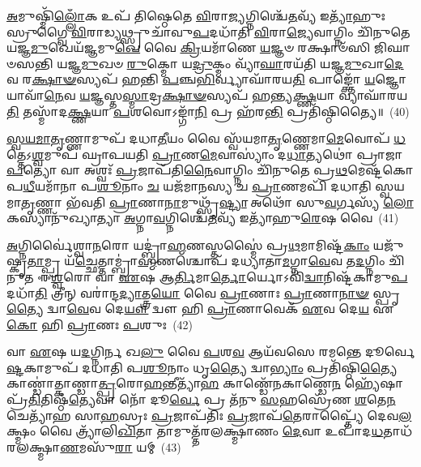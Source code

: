 \-\ul{𑌅}\-𑌮𑍁𑌷𑍍𑌮𑌿᳴\-\ul{𑌲𑍍𑌲𑍋𑌁}\-𑌕 𑌉𑌪᳴ 𑌤𑌿𑌷𑍍𑌠𑍇𑌤𑍇 \ul{𑌵𑌿}\-𑌰𑌾\-\ul{𑌜𑍍𑌯}\-𑌗𑍍𑌨𑌿𑌶𑍍𑌚𑍇᳴\-\ul{𑌤}\-𑌵𑍍𑌯᳴ 𑌇\-\ul{𑌤𑍍𑌯𑌾}\-᳴𑌹𑍁𑌃 𑌸𑍍𑌰𑍁𑌗𑍍𑌵𑍈 \ul{𑌵𑌿}\-𑌰𑌾𑌡𑍍𑌯𑌥𑍍𑌸𑍍𑌰𑍁𑌚𑌾᳴𑌵𑍁\-\ul{𑌪}\-𑌦𑌧𑌾᳴𑌤𑌿 \ul{𑌵𑌿}\-𑌰𑌾\-\ul{𑌜𑍍𑌯𑍇}\-𑌵𑌾𑌗𑍍𑌨𑌿𑌂 𑌚𑌿᳴𑌨𑍁𑌤𑍇 𑌯𑌜𑍍𑌞\-\ul{𑌮𑍁}\-𑌖𑍇𑌯᳴𑌜𑍍𑌞𑌮𑍁\-\ul{𑌖𑍇} 𑌵𑍈 \ul{𑌕𑍍𑌰𑌿}\-𑌯𑌮𑌾᳴𑌣𑍇 \ul{𑌯}\-𑌜𑍍𑌞𑍞 𑌰𑌕𑍍𑌷𑌾𑍞᳴𑌸𑌿 𑌜𑌿𑌘𑌾𑍞𑌸𑌨𑍍𑌤𑌿 𑌯𑌜𑍍𑌞\-\ul{𑌮𑍁}\-𑌖𑍞 \ul{𑌰𑍁}\-𑌕𑍍𑌮𑍋 𑌯\-\ul{𑌦𑍍𑌰𑍁}\-𑌕𑍍𑌮𑌂 𑌵𑍍𑌯𑌾᳴\-\ul{𑌘𑌾}\-𑌰𑌯᳴𑌤𑌿 𑌯𑌜𑍍𑌞\-\ul{𑌮𑍁}\-𑌖𑌾\-\ul{𑌦𑍇}\-𑌵 𑌰\-\ul{𑌕𑍍𑌷𑌾}\-\-\ul{𑍟}\-𑌸𑍍𑌯𑌪᳴ 𑌹𑌨𑍍𑌤𑌿 \ul{𑌪}\-𑌞𑍍𑌚\-\ul{𑌭𑌿}\-𑌰𑍍𑌵𑍍𑌯𑌾𑌘𑌾᳴𑌰𑌯\-\ul{𑌤𑌿} 𑌪𑌾𑌙𑍍𑌕𑍍𑌤𑍋᳴ \ul{𑌯}\-𑌜𑍍𑌞𑍋 𑌯𑌾𑌵𑌾᳴\-\ul{𑌨𑍇}\-𑌵 \ul{𑌯}\-𑌜𑍍𑌞𑌸𑍍𑌤\-\ul{𑌸𑍍𑌮𑌾}\-𑌦𑍍𑌰\-\ul{𑌕𑍍𑌷𑌾}\-\-\ul{𑍟}\-𑌸𑍍𑌯𑌪᳴ 𑌹𑌨𑍍𑌤𑍍𑌯\-\ul{𑌕𑍍𑌷𑍍𑌣}\-𑌯𑌾 𑌵𑍍𑌯𑌾𑌘𑌾᳴𑌰𑌯\-\ul{𑌤𑌿} 𑌤𑌸𑍍𑌮𑌾᳴𑌦\-\ul{𑌕𑍍𑌷𑍍𑌣}\-𑌯𑌾 \ul{𑌪}\-𑌶𑌵𑍋\-𑌽𑌙𑍍𑌗𑌾᳴\-\ul{𑌨𑌿} 𑌪𑍍𑌰 𑌹᳴𑌰\-\ul{𑌨𑍍𑌤𑌿} 𑌪𑍍𑌰𑌤𑌿᳴𑌷𑍍𑌠𑌿𑌤𑍍𑌯𑍈॥~(40)

{\anuvakamend[{𑌵\-\ul{𑌨}\-𑌸𑍍𑌪𑌤᳴𑌯𑍋 𑌦𑌕𑍍𑌷𑌿\-\ul{𑌣}\-𑌤𑍋 𑌧᳴𑌤𑍍𑌤 𑌏\-\ul{𑌨}\-𑌨𑍍𑌤𑌸𑍍𑌮𑌾᳴𑌦\-\ul{𑌕𑍍𑌷𑍍𑌣}\-𑌯𑌾 𑌪𑌞𑍍𑌚᳴ 𑌚}]}%

\-\ul{𑌸𑍍𑌵}\-\-\ul{𑌯}\-\-\ul{𑌮𑌾}\-\-\ul{𑌤𑍃}\-𑌣𑍍𑌣𑌾𑌮𑍁𑌪᳴ 𑌦𑌧𑌾\-\ul{𑌤𑍀}\-𑌯𑌂 𑌵𑍈 𑌸𑍍𑌵᳴𑌯𑌮𑌾\-\ul{𑌤𑍃}\-𑌣𑍍𑌣𑍇𑌮𑌾\-\ul{𑌮𑍇}\-𑌵𑍋𑌪᳴ \ul{𑌧}\-𑌤𑍍𑌤𑍇\-𑌽\-\ul{𑌶𑍍𑌵}\-𑌮𑍁𑌪᳴ 𑌘𑍍𑌰𑌾𑌪𑌯𑌤𑌿 \ul{𑌪𑍍𑌰𑌾}\-𑌣\-\ul{𑌮𑍇}\-𑌵𑌾𑌸𑍍𑌯𑌾𑌂॑ 𑌦\-\ul{𑌧𑌾}\-𑌤𑍍𑌯𑌥𑍋॑ 𑌪𑍍𑌰𑌾𑌜𑌾\-\ul{𑌪}\-𑌤𑍍𑌯𑍋 𑌵𑌾 𑌅𑌶𑍍𑌵𑌃᳴ \ul{𑌪𑍍𑌰}\-𑌜𑌾𑌪᳴𑌤𑌿\-\ul{𑌨𑍈}\-𑌵𑌾𑌗𑍍𑌨𑌿𑌂 𑌚𑌿᳴𑌨𑍁𑌤𑍇 𑌪𑍍𑌰\-\ul{𑌥}\-𑌮𑍇𑌷𑍍𑌟᳴𑌕𑍋𑌪\-\ul{𑌧𑍀}\-𑌯𑌮𑌾᳴𑌨𑌾 𑌪\-\ul{𑌶𑍂}\-𑌨𑌾𑌂 \ul{𑌚} 𑌯𑌜᳴𑌮𑌾𑌨𑌸𑍍𑌯 𑌚 \ul{𑌪𑍍𑌰𑌾}\-𑌣𑌮𑌪𑌿᳴ 𑌦𑌧𑌾𑌤𑌿 𑌸𑍍𑌵𑌯𑌮𑌾\-\ul{𑌤𑍃}\-𑌣𑍍𑌣𑌾 𑌭᳴𑌵𑌤𑌿 \ul{𑌪𑍍𑌰𑌾}\-𑌣𑌾\-\ul{𑌨𑌾}\-𑌮𑍁𑌥𑍍𑌸𑍃᳴\-\ul{𑌷𑍍𑌟𑍍𑌯𑌾} 𑌅𑌥𑍋᳴ 𑌸𑍁\-\ul{𑌵}\-𑌰𑍍𑌗𑌸𑍍𑌯᳴ \ul{𑌲𑍋}\-𑌕𑌸𑍍𑌯𑌾𑌨𑍁᳴𑌖𑍍𑌯𑌾𑌤𑍍𑌯𑌾 \ul{𑌅}\-𑌗𑍍𑌨𑌾\-\ul{𑌵}\-𑌗𑍍𑌨𑌿𑌶𑍍𑌚𑍇᳴\-\ul{𑌤}\-𑌵𑍍𑌯᳴ 𑌇𑌤𑍍𑌯𑌾᳴𑌹𑍁\-\ul{𑌰𑍇}\-𑌷 𑌵𑍈~(41)

\-\ul{𑌅}\-𑌗𑍍𑌨𑌿𑌰𑍍𑌵𑍈॑𑌶𑍍𑌵𑌾\-\ul{𑌨}\-𑌰𑍋 𑌯𑌦𑍍𑌬𑍍𑌰𑌾॑\-\ul{𑌹𑍍𑌮}\-𑌣𑌸𑍍𑌤𑌸𑍍𑌮𑍈॑ 𑌪𑍍𑌰\-\ul{𑌥}\-𑌮𑌾𑌮𑌿𑌷𑍍𑌟᳴\-\ul{𑌕𑌾𑌂} 𑌯𑌜𑍁᳴𑌷𑍍𑌕𑍃\-\ul{𑌤𑌾}\-𑌮𑍍𑌪𑍍𑌰 𑌯᳴\-\ul{𑌚𑍍𑌛𑍇}\-𑌤𑍍𑌤𑌾𑌮𑍍𑌬𑍍𑌰𑌾॑\-\ul{𑌹𑍍𑌮}\-𑌣𑌶𑍍𑌚𑍋𑌪᳴ 𑌦𑌧𑍍𑌯𑌾𑌤𑌾\-\ul{𑌮}\-𑌗𑍍𑌨𑌾\-\ul{𑌵𑍇}\-𑌵 𑌤\-\ul{𑌦}\-𑌗𑍍𑌨𑌿𑌂 𑌚𑌿᳴𑌨𑍁𑌤 𑌈\-\ul{𑌶𑍍𑌵}\-𑌰𑍋 𑌵𑌾 \ul{𑌏}\-𑌷 𑌆\-\ul{𑌰𑍍𑌤𑌿}\-𑌮𑌾\-\ul{𑌰𑍍𑌤𑍋}\-𑌰𑍍𑌯𑍋\-𑌽𑌵𑌿᳴\-\ul{𑌦𑍍𑌵𑌾}\-𑌨𑌿𑌷𑍍𑌟᳴𑌕𑌾𑌮𑍁\-\ul{𑌪}\-𑌦𑌧𑌾᳴\-\ul{𑌤𑌿} 𑌤𑍍𑌰𑍀𑌨𑍍 𑌵𑌰𑌾॑𑌨𑍍𑌦\-\ul{𑌦𑍍𑌯𑌾}\-𑌤𑍍𑌤𑍍𑌰\-\ul{𑌯𑍋} 𑌵𑍈 \ul{𑌪𑍍𑌰𑌾}\-𑌣𑌾𑌃 \ul{𑌪𑍍𑌰𑌾}\-𑌣𑌾\-\ul{𑌨𑌾}\-\-\ul{𑍟} 𑌸𑍍𑌪𑍃\-\ul{𑌤𑍍𑌯𑍈} 𑌦𑍍𑌵𑌾\-\ul{𑌵𑍇}\-𑌵 𑌦𑍇\-\ul{𑌯𑍗} 𑌦𑍍𑌵𑍗 𑌹𑌿 \ul{𑌪𑍍𑌰𑌾}\-𑌣𑌾𑌵𑍇𑌕᳴ \ul{𑌏}\-𑌵 𑌦𑍇\-\ul{𑌯} 𑌏\-\ul{𑌕𑍋} 𑌹𑌿 \ul{𑌪𑍍𑌰𑌾}\-𑌣𑌃 \ul{𑌪}\-𑌶𑍁𑌃~(42)

𑌵𑌾 \ul{𑌏}\-𑌷 𑌯\-\ul{𑌦}\-𑌗𑍍𑌨𑌿𑌰𑍍𑌨 𑌖\-\ul{𑌲𑍁} 𑌵𑍈 \ul{𑌪}\-𑌶\-\ul{𑌵} 𑌆𑌯᳴𑌵𑌸𑍇 𑌰𑌮𑌨𑍍𑌤𑍇 𑌦𑍂𑌰𑍍𑌵𑍇\-\ul{𑌷𑍍𑌟}\-𑌕𑌾𑌮𑍁𑌪᳴ 𑌦𑌧𑌾𑌤𑌿 𑌪\-\ul{𑌶𑍂}\-𑌨𑌾𑌂 𑌧𑍃\-\ul{𑌤𑍍𑌯𑍈} 𑌦𑍍𑌵𑌾\-\ul{𑌭𑍍𑌯𑌾𑌂} 𑌪𑍍𑌰𑌤𑌿᳴𑌷𑍍𑌠𑌿\-\ul{𑌤𑍍𑌯𑍈} 𑌕𑌾𑌣𑍍𑌡𑌾॑𑌤𑍍𑌕𑌾𑌣𑍍𑌡𑌾\-\ul{𑌤𑍍𑌪𑍍𑌰}\-𑌰𑍋\-\ul{𑌹}\-𑌨𑍍𑌤𑍀𑌤𑍍𑌯𑌾᳴\-\ul{𑌹} 𑌕𑌾𑌣𑍍𑌡𑍇᳴𑌨𑌕𑌾𑌣𑍍𑌡𑍇\-\ul{𑌨} 𑌹𑍍𑌯𑍇᳴𑌷𑌾 𑌪𑍍𑌰᳴\-\ul{𑌤𑌿}\-𑌤𑌿𑌷𑍍𑌠᳴\-\ul{𑌤𑍍𑌯𑍇}\-𑌵𑌾 𑌨𑍋᳴ 𑌦𑍂\-\ul{𑌰𑍍𑌵𑍇} 𑌪𑍍𑌰 𑌤᳴𑌨𑍁 \ul{𑌸}\-𑌹𑌸𑍍𑌰𑍇᳴𑌣 \ul{𑌶}\-𑌤𑍇\-\ul{𑌨} 𑌚𑍇𑌤𑍍𑌯𑌾᳴𑌹 𑌸𑌾\-\ul{𑌹}\-𑌸𑍍𑌰𑌃 \ul{𑌪𑍍𑌰}\-𑌜𑌾𑌪᳴𑌤𑌿𑌃 \ul{𑌪𑍍𑌰}\-𑌜𑌾𑌪᳴\-\ul{𑌤𑍇}\-𑌰𑌾𑌪𑍍𑌤𑍍𑌯𑍈᳴ 𑌦𑍇𑌵\-\ul{𑌲}\-𑌕𑍍𑌷𑍍𑌮𑌂 𑌵𑍈 𑌤𑍍𑌰𑍍𑌯𑌾᳴𑌲𑌿\-\ul{𑌖𑌿}\-𑌤𑌾 𑌤𑌾𑌮𑍁𑌤𑍍𑌤᳴𑌰𑌲𑌕𑍍𑌷𑍍𑌮𑌾𑌣𑌂 \ul{𑌦𑍇}\-𑌵𑌾 𑌉𑌪𑌾᳴𑌦\-\ul{𑌧}\-𑌤𑌾𑌧᳴𑌰𑌲𑌕𑍍𑌷𑍍𑌮𑌾\-\ul{𑌣}\-𑌮𑌸𑍁᳴\-\ul{𑌰𑌾} 𑌯𑌮𑍍~(43)

